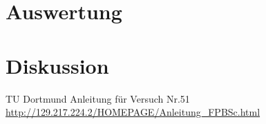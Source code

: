 \section{Auswertung}
\section{Diskussion}


\newpage
 \begin{thebibliography}{WissOnl}
 	 TU Dortmund Anleitung für Versuch Nr.51 \url{http://129.217.224.2/HOMEPAGE/Anleitung_FPBSc.html}
 	\end{thebibliography}




